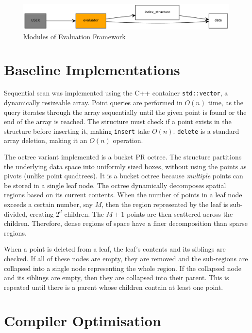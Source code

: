 \begin{figure}
	\centering
	\includegraphics[scale=0.6]{figures/evaluation_framework.pdf}
	\caption{Modules of Evaluation Framework}
	\label{fig:evaluation-framework}
\end{figure}

\section{Baseline Implementations}

Sequential scan was implemented using the C++ container \texttt{std::vector}, a dynamically resizeable array.  Point queries are performed in $O(n)$ time, as the query iterates through the array sequentially until the given point is found or the end of the array is reached. The structure must check if a point exists in the structure before inserting it, making \texttt{insert} take $O(n)$. \texttt{delete} is a standard array deletion, making it an $O(n)$ operation.

The octree variant implemented is a bucket PR octree. The structure partitions the underlying data space into uniformly sized boxes, without using the points as pivots (unlike point quadtrees). It is a bucket octree because \textit{multiple} points can be stored in a single leaf node. The octree dynamically decomposes spatial regions based on its current contents. When the number of points in a leaf node exceeds a certain number, say $M$, then the region represented by the leaf is sub-divided, creating $2^d$ children. The $M + 1$ points are then scattered across the children. Therefore, dense regions of space have a finer decomposition than sparse regions.

When a point is deleted from a leaf, the leaf's contents and its siblings are checked. If all of these nodes are empty, they are removed and the sub-regions are collapsed into a single node representing the whole region. If the collapsed node and its siblings are empty, then they are collapsed into their parent. This is repeated until there is a parent whose children contain at least one point.

\section{Compiler Optimisation}

